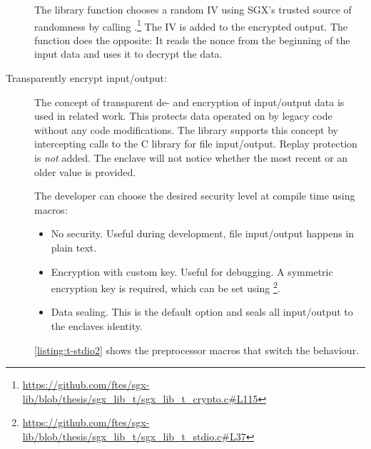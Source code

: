 \begin{description}
The library  function chooses a random IV using SGX's trusted source of randomness by calling .\footnote{\url{https://github.com/ftes/sgx-lib/blob/thesis/sgx_lib_t/sgx_lib_t_crypto.c\#L115}}\label{ID_1930346952}
The IV is added to the encrypted output.\label{ID_874781129}
The  function does the opposite: It reads the nonce from the beginning of the input data and uses it to decrypt the data.\label{ID_517725294}
\item[Transparently encrypt input/output:]\label{ID_311895693}
The concept of transparent de- and encryption of input/output data is used in related work.\label{ID_778969112}
This protects data operated on by legacy code without any code modifications.\label{ID_611240197}
The library supports this concept by intercepting calls to the C library for file input/output.\label{ID_941785830}
Replay protection is \textit{not} added. The enclave will not notice whether the most recent or an older value is provided.\label{ID_966291793}

The developer can choose the desired security level at compile time using macros:\label{ID_285147481}
\begin{itemize}\label{ID_568616326}
\item No security. Useful during development, file input/output happens in plain text.\label{ID_108413610}
\item Encryption with custom key. Useful for debugging. A symmetric encryption key is required, which can be set using \footnote{\url{https://github.com/ftes/sgx-lib/blob/thesis/sgx_lib_t/sgx_lib_t_stdio.c\#L37}}.\label{ID_435062126}
\item Data sealing. This is the default option and seals all input/output to the enclaves identity.\label{ID_1378302633}
\end{itemize}\label{ID_1605929524}
\autoref{listing:t-stdio2} shows the preprocessor macros that switch the behaviour.\label{ID_1912924398}
\label{ID_1188639684}
\end{description}\label{ID_354449538}
